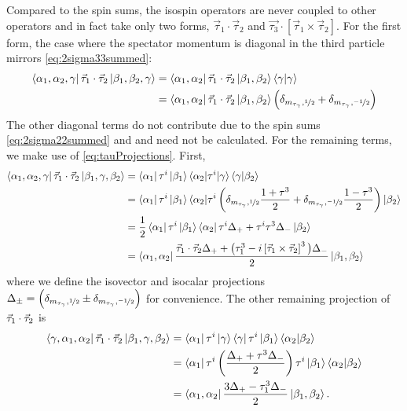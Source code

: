 Compared to the spin sums, the isospin operators are never coupled to other operators and in fact take only two forms, $\vec{\tau}_1\cdot\vec{\tau}_2$ and $\vec{\tau_3}\cdot[\vec{\tau}_1\times\vec{\tau}_2]$. For the first form, the case where the spectator momentum is diagonal in the third particle mirrors \eqref{eq:2sigma33summed}:
\begin{equation}\begin{split}
\bra{\alpha_1,\alpha_2, \gamma } \vec{\tau}_1\cdot \vec{\tau}_2 \ket{\beta_1, \beta_2, \gamma} 
&= \bra{\alpha_1,\alpha_2 } \vec{\tau}_1\cdot \vec{\tau}_2 \ket{\beta_1, \beta_2} \braket{\gamma|\gamma} \\
&= \bra{\alpha_1,\alpha_2 } \vec{\tau}_1\cdot \vec{\tau}_2 \ket{\beta_1, \beta_2} \left(\delta_{m_{\tau_\gamma},\nicefrac{1}{2}}+\delta_{m_{\tau_\gamma},\nicefrac{-1}{2}} \right) 
\end{split}
\end{equation}
The other diagonal terms do not contribute due to the spin sums \eqref{eq:2sigma22summed} and \label{eq:3sigma32summed} and need not be calculated. For the remaining terms, we make use of \eqref{eq:tauProjections}. First,
\begin{equation}\begin{split}
\bra{\alpha_1, \alpha_2, \gamma } \vec{\tau}_1\cdot \vec{\tau}_2 \ket{\beta_1,\gamma,  \beta_2} 
&= \bra{\alpha_1}\tau^i\ket{\beta_1}\braket{\alpha_2 | \tau^i | \gamma} \braket{\gamma | \beta_2} \\
&= \bra{\alpha_1}\tau^i\ket{\beta_1}\braket{\alpha_2 | \tau^i  \left(\delta_{m_{\tau_\gamma},\nicefrac{1}{2}}\dfrac{1+\tau^3}{2}+\delta_{m_{\tau_\gamma},\nicefrac{-1}{2}}\frac{1-\tau^3}{2}\right) | \beta_2} \\
&=\frac{1}{2} \bra{\alpha_1}\tau^i\ket{\beta_1}\bra{\alpha_2} \tau^i  \Delta_+ +\tau^i \tau^3 \Delta_-\ket{\beta_2}\\
&=\bra{\alpha_1,\alpha_2} \frac{\vec{\tau}_1\cdot\vec{\tau}_2\Delta_+ + \big(\tau_1^3-i\left[\vec{\tau}_1\times\vec{\tau}_2\right]^3\big)\Delta_-}{2}\ket{\beta_1,\beta_2}
\end{split}
\end{equation}
where we define the isovector and isocalar projections $\Delta_\pm=\left(\delta_{m_{\tau_\gamma},\nicefrac{1}{2}}\pm\delta_{m_{\tau_\gamma},\nicefrac{-1}{2}} \right)$ for convenience. The other remaining projection of $\vec{\tau}_1\cdot\vec{\tau}_2$ is
\begin{equation}\begin{split}
\bra{\gamma, \alpha_1, \alpha_2 } \vec{\tau}_1\cdot \vec{\tau}_2 \ket{\beta_1,\gamma,  \beta_2} 
&= \bra{\alpha_1}\tau^i\ket{\gamma}\bra{\gamma}\tau^i\ket{\beta_1}\braket{\alpha_2|\beta_2} \\
&= \bra{\alpha_1}\tau^i\left(\frac{\Delta_+ + \tau^3\Delta_-}{2}\right)\tau^i\ket{\beta_1}\braket{\alpha_2|\beta_2} \\
&= \bra{\alpha_1,\alpha_2}\frac{3\Delta_+-\tau_1^3\Delta_-}{2}\ket{\beta_1,\beta_2}.
\end{split}
\end{equation}
